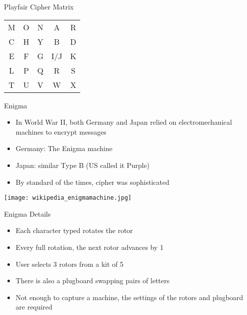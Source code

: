 \begin{withoutheadline}
\begin{frame}[fragile]{Playfair Cipher Matrix}
\begin{tabular}{|c|c|c|c|c|}
  M & O & N & A & R   \\
  C & H & Y & B & D   \\
  E & F & G & I/J & K \\
  L & P & Q & R & S   \\
  T & U & V & W & X   \\
\end{tabular}
\end{frame}

\begin{frame}{Enigma}
    \begin{itemize}
        \item In World War II, both Germany and Japan relied on electromechanical machines to encrypt messages
        \item Germany: The Enigma machine
        \item Japan: similar Type B (US called it Purple)
        \item By standard of the times, cipher was sophisticated 
    \end{itemize}
    \texttt{[image: wikipedia\_enigmamachine.jpg]}
    \end{frame}

\begin{frame}{Enigma Details}
    \begin{itemize}
        \item Each character typed rotates the rotor
        \item Every full rotation, the next rotor advances by 1
        \item User selects 3 rotors from a kit of 5
        \item There is also a plugboard swapping pairs of letters
        \item Not enough to capture a machine, the settings of the rotors and plugboard are required
    \end{itemize}
\end{frame}


\end{withoutheadline}
